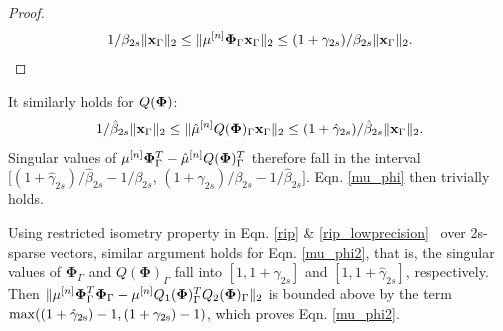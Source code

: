 \documentclass[aoas,preprint]{imsart}
\numberwithin{equation}{section}
\theoremstyle{plain}
\begin{document}
{\begin{proof}
\begin{equation}
\begin{aligned}
   1/\beta_{2s} \| {\bf x}_{\Gamma}\|_2\leq \|{\mu}^{[n]}{\bf {\bf \Phi}}_{\Gamma} {\bf x}_{\Gamma}\|_2\leq (1+\gamma_{2s})/\beta_{2s}\| {\bf x}_{\Gamma}\|_2.
\end{aligned}
\end{equation}
\end{proof}
It similarly holds for $Q(\boldsymbol{{\bf \Phi}})$:
\begin{equation}
\begin{aligned}
   1/\hat{\beta}_{2s} \| {\bf x}_{\Gamma}\|_2\leq \|{\hat{\mu}}^{[n]}Q({\bf {\bf \Phi}})_{\Gamma} {\bf x}_{\Gamma}\|_2\leq (1+\hat{\gamma}_{2s})/\hat{\beta}_{2s}\| {\bf x}_{\Gamma}\|_2.
\end{aligned}
\end{equation}
Singular values of ${\mu}^{[n]}{\bf {\bf \Phi}}_{\Gamma}^T-\hat{\mu}^{[n]}Q({\bf {\bf \Phi}})_{\Gamma}^T$ therefore fall in the interval $[({1+\hat{\gamma}_{2s}})/{\hat{\beta}_{2s}}-{1}/{\beta_{2s}}$, $({1+\gamma_{2s}})/{\beta_{2s}}-{1}/{\hat{\beta}_{2s}}]$. Eqn. \ref{mu_phi} then trivially holds.
\vspace{0.5em}

Using restricted isometry property in Eqn. \ref{rip} \& \ref{rip_lowprecision} \  over 2s-sparse vectors, similar argument holds for Eqn. \ref{mu_phi2}, that is, the singular values of $\boldsymbol{\Phi}_{\Gamma}$ and $Q(\boldsymbol{\Phi})_{\Gamma}$ fall into $[1, 1+ \gamma_{2s}]$ and $[1, 1+ \hat{\gamma}_{2s}]$, respectively. Then $\|\mu^{[n]}\boldsymbol{\Phi}_{\Gamma}^T\boldsymbol{{\bf \Phi}}_{\Gamma} - \mu^{[n]}Q_1(\boldsymbol{\Phi})_{\Gamma}^TQ_2(\boldsymbol{\Phi})_{\Gamma}\|_2$ is bounded above by the term $\rm{max}((1+\hat{\gamma}_{2s})-1, (1+\gamma_{2s})-1)$, which proves Eqn. \ref{mu_phi2}. 
\vspace{0.5em}

}
\end{document}

